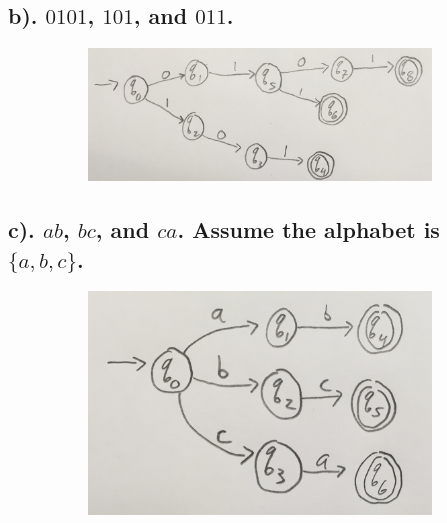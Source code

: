 \documentclass[20pt]{article} %
\begin{document}
\subsection{b). $0101$, $101$, and $011$.}
\begin{figure}[!htbp]
  	\centering
   	\begin{subfigure}[p]{0.7\linewidth}
    	\includegraphics[width=\linewidth]{./figures/h2-7.jpg}
   	\end{subfigure}
\end{figure}
\subsection{c). $ab$, $bc$, and $ca$. Assume the alphabet is $\{a,b,c\}$. }
\begin{figure}[!htbp]
  	\centering
   	\begin{subfigure}[p]{0.7\linewidth}
    	\includegraphics[width=\linewidth]{./figures/h2-8.jpg}
   	\end{subfigure}
\end{figure}
\newpage
\end{document}
